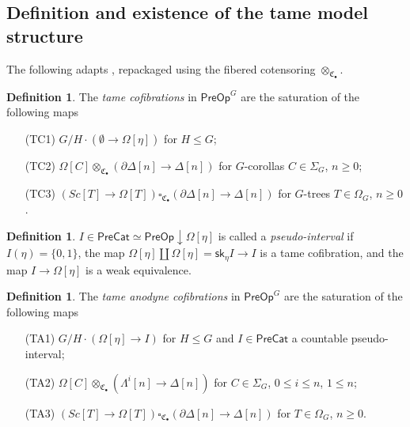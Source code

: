 \documentclass[a4paper,10pt
,draft
]{article}%
\numberwithin{equation}{section}
\numberwithin{figure}{section}
\theoremstyle{definition} %
\newtheorem{definition}[equation]{Definition}%
\newcommand{\1}{\ensuremath{\mathbbm 1}}%
\begin{document}
\subsection{Definition and existence of the tame model structure}
\label{TAMEDEFEX SEC}

The following adapts \cite[\S 7.7]{CM13b},
repackaged using the fibered cotensoring
$\otimes_{\mathfrak{C}_{\bullet}}$.

\begin{definition}\label{TAMEGENCOF DEF}
	The \emph{tame cofibrations} in $\mathsf{PreOp}^G$
	are the saturation of the following maps
	\begin{itemize}
		\item[(TC1)] $G/H \cdot \left(\emptyset \to\Omega[\eta]\right)$ for $H\leq G$;
		\item[(TC2)] 
		$\Omega[C] \otimes_{\mathfrak{C}_{\bullet}} \left(\partial \Delta[n] \to \Delta[n]\right)$ for 
		$G$-corollas $C \in \Sigma_G$, $n \geq 0$;
		\item[(TC3)] 
		$\left( Sc[T] \to \Omega[T] \right) 
		\square_{\mathfrak{C}_{\bullet}} 
		\left(\partial \Delta[n] \to \Delta[n]\right)$ for 
		$G$-trees $T \in \Omega_G$, $n \geq 0$.
	\end{itemize}
\end{definition}


\begin{definition}\label{PSEUINT DEF}
	$I \in \mathsf{PreCat}\simeq \mathsf{PreOp} \downarrow \Omega[\eta]$ 
	is called a \emph{pseudo-interval}
	if $I(\eta) = \{0,1\}$,
	the map 
	$\Omega[\eta] \amalg \Omega[\eta]
	= \mathsf{sk}_{\eta} I \to I$
	is a tame cofibration,
	and the map $I \to \Omega[\eta]$ is a weak equivalence.
\end{definition}


\begin{definition}\label{TAMEGENANO DEF}
	The \emph{tame anodyne cofibrations} in $\mathsf{PreOp}^G$ 
	are the saturation of the following maps
	\begin{itemize}
		\item[(TA1)] $G/H \cdot 
		\left(\Omega[\eta] \to I \right)$ for $H \leq G$
		and $I \in \mathsf{PreCat}$
		a countable pseudo-interval;
		\item[(TA2)] $\Omega[C] \otimes_{\mathfrak{C}_{\bullet}} \left(\Lambda^i[n] \to \Delta[n]\right)$ for $C \in \Sigma_G$, $0 \leq i \leq n$, $1 \leq n$;
		\item[(TA3)] 
		$\left( Sc[T] \to \Omega[T] \right) 
		\square_{\mathfrak{C}_{\bullet}}
		\left(\partial \Delta[n] \to \Delta[n]\right)$ for $T \in \Omega_G$, $n \geq 0$.
	\end{itemize}
\end{definition}
\end{document}
